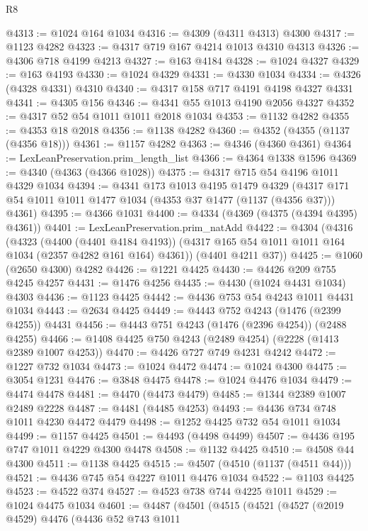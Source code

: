\begin{lexlean}{R8}
\begin{coremodule}
@4313 := @1024 @164 @1034
@4316 := @4309 (@4311 @4313) @4300
@4317 := @1123 @4282
@4323 := @4317 @719 @167 @4214 @1013 @4310 @4313
@4326 := @4306 @718 @4199 @4213
@4327 := @163 @4184
@4328 := @1024 @4327
@4329 := @163 @4193
@4330 := @1024 @4329
@4331 := @4330 @1034
@4334 := @4326 (@4328 @4331) @4310
@4340 := @4317 @158 @717 @4191 @4198 @4327 @4331
@4341 := @4305 @156
@4346 := @4341 @55 @1013 @4190 @2056 @4327
@4352 := @4317 @52 @54 @1011 @1011 @2018 @1034
@4353 := @1132 @4282
@4355 := @4353 @18 @2018
@4356 := @1138 @4282
@4360 := @4352 (@4355 (@1137 (@4356 @18)))
@4361 := @1157 @4282
@4363 := @4346 (@4360 @4361)
@4364 := LexLeanPreservation.prim_length_list
@4366 := @4364 @1338 @1596
@4369 := @4340 (@4363 (@4366 @1028))
@4375 := @4317 @715 @54 @4196 @1011 @4329 @1034
@4394 := @4341
    @173
    @1013
    @4195
    @1479
    @4329
    (@4317 @171 @54 @1011 @1011 @1477 @1034 (@4353 @37 @1477 (@1137 (@4356 @37))) @4361)
@4395 := @4366 @1031
@4400 := @4334 (@4369 (@4375 (@4394 @4395) @4361))
@4401 := LexLeanPreservation.prim_natAdd
@4422 := @4304
    (@4316
      (@4323
        (@4400 (@4401 @4184 @4193))
        (@4317 @165 @54 @1011 @1011 @164 @1034 (@2357 @4282 @161 @164) @4361))
      (@4401 @4211 @37))
@4425 := @1060 (@2650 @4300) @4282
@4426 := @1221 @4425
@4430 := @4426 @209 @755 @4245 @4257
@4431 := @1476 @4256
@4435 := @4430 (@1024 @4431 @1034) @4303
@4436 := @1123 @4425
@4442 := @4436 @753 @54 @4243 @1011 @4431 @1034
@4443 := @2634 @4425
@4449 := @4443 @752 @4243 (@1476 (@2399 @4255)) @4431
@4456 := @4443 @751 @4243 (@1476 (@2396 @4254)) (@2488 @4255)
@4466 := @1408 @4425 @750 @4243 (@2489 @4254) (@2228 (@1413 @2389 @1007 @4253))
@4470 := @4426 @727 @749 @4231 @4242
@4472 := @1227 @732 @1034
@4473 := @1024 @4472
@4474 := @1024 @4300
@4475 := @3054 @1231
@4476 := @3848 @4475
@4478 := @1024 @4476 @1034
@4479 := @4474 @4478
@4481 := @4470 (@4473 @4479)
@4485 := @1344 @2389 @1007 @2489 @2228
@4487 := @4481 (@4485 @4253)
@4493 := @4436 @734 @748 @1011 @4230 @4472 @4479
@4498 := @1252 @4425 @732 @54 @1011 @1034
@4499 := @1157 @4425
@4501 := @4493 (@4498 @4499)
@4507 := @4436 @195 @747 @1011 @4229 @4300 @4478
@4508 := @1132 @4425
@4510 := @4508 @44 @4300
@4511 := @1138 @4425
@4515 := @4507 (@4510 (@1137 (@4511 @44)))
@4521 := @4436 @745 @54 @4227 @1011 @4476 @1034
@4522 := @1103 @4425
@4523 := @4522 @374
@4527 := @4523 @738 @744 @4225 @1011
@4529 := @1024 @4475 @1034
@4601 := @4487
    (@4501
      (@4515
        (@4521
          (@4527
            (@2019 @4529)
            @4476
            (@4436
              @52
              @743
              @1011

\end{coremodule}
\end{lexlean}
